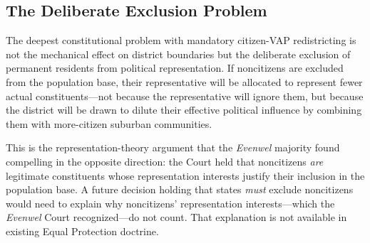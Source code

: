 \subsection{The Deliberate Exclusion Problem}

The deepest constitutional problem with mandatory citizen-VAP redistricting is not the mechanical effect on district boundaries but the deliberate exclusion of permanent residents from political representation. If noncitizens are excluded from the population base, their representative will be allocated to represent fewer actual constituents---not because the representative will ignore them, but because the district will be drawn to dilute their effective political influence by combining them with more-citizen suburban communities.

This is the representation-theory argument that the \emph{Evenwel} majority found compelling in the opposite direction: the Court held that noncitizens \emph{are} legitimate constituents whose representation interests justify their inclusion in the population base. A future decision holding that states \emph{must} exclude noncitizens would need to explain why noncitizens' representation interests---which the \emph{Evenwel} Court recognized---do not count. That explanation is not available in existing Equal Protection doctrine.
